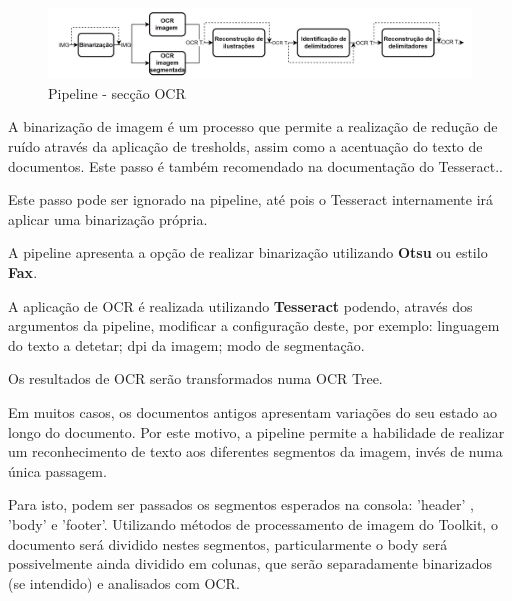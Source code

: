 \begin{figure}[H]
	\centering
	\includegraphics[width=1\textwidth]{images/diagramas/arquitetura_pipeline_ocr.png}
	\caption{Pipeline - secção OCR}
	\label{fig:arquitetura_pipeline_ocr}
\end{figure}




A binarização de imagem é um processo que permite a realização de redução de ruído através da aplicação de tresholds, assim como a acentuação do texto de documentos. Este passo é também recomendado na documentação do Tesseract..

Este passo pode ser ignorado na pipeline, até pois o Tesseract internamente irá aplicar uma binarização própria.

A pipeline apresenta a opção de realizar binarização utilizando \textbf{Otsu} ou estilo \textbf{Fax}.





A aplicação de OCR é realizada utilizando \textbf{Tesseract} podendo, através dos argumentos da pipeline, modificar a configuração deste, por exemplo: linguagem do texto a detetar; dpi da imagem; modo de segmentação.

Os resultados de OCR serão transformados numa OCR Tree.



Em muitos casos, os documentos antigos apresentam variações do seu estado ao longo do documento. Por este motivo, a pipeline permite a habilidade de realizar um reconhecimento de texto aos diferentes segmentos da imagem, invés de numa única passagem. 

Para isto, podem ser passados os segmentos esperados na consola: 'header' , 'body' e 'footer'. Utilizando métodos de processamento de imagem do Toolkit, o documento será dividido nestes segmentos, particularmente o body será possivelmente ainda dividido em colunas, que serão separadamente binarizados (se intendido) e analisados com OCR.


